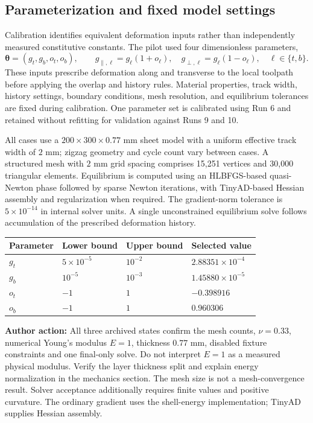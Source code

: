 \documentclass[11pt]{article}
\newcommand{\pending}[1]{\par\noindent\textbf{Author action:} #1\par}
\begin{document}
\subsection{Parameterization and fixed model settings}
Calibration identifies equivalent deformation inputs rather than independently measured constitutive constants. The pilot used four dimensionless parameters,
\begin{equation}
\boldsymbol\theta=(g_t,g_b,o_t,o_b),\qquad
 g_{\parallel,\ell}=g_\ell(1+o_\ell),\quad
 g_{\perp,\ell}=g_\ell(1-o_\ell),\quad \ell\in\{t,b\}.
\end{equation}
These inputs prescribe deformation along and transverse to the local toolpath before applying the overlap and history rules. Material properties, track width, history settings, boundary conditions, mesh resolution, and equilibrium tolerances are fixed during calibration. One parameter set is calibrated using Run 6 and retained without refitting for validation against Runs 9 and 10.

All cases use a $200\times300\times0.77$ mm sheet model with a uniform effective track width of $2$ mm; zigzag geometry and cycle count vary between cases. A structured mesh with $2$ mm grid spacing comprises 15,251 vertices and 30,000 triangular elements. Equilibrium is computed using an HLBFGS-based quasi-Newton phase \cite{liu2010hlbfgs} followed by sparse Newton iterations, with TinyAD-based Hessian assembly \cite{schmidt2022tinyad} and regularization when required. The gradient-norm tolerance is $5\times10^{-14}$ in internal solver units. A single unconstrained equilibrium solve follows accumulation of the prescribed deformation history.

\begin{center}
\begin{tabular}{llll}\toprule
Parameter & Lower bound & Upper bound & Selected value \\\midrule
$g_t$ & $5\times10^{-5}$ & $10^{-2}$ & $2.88351\times10^{-4}$ \\
$g_b$ & $10^{-5}$ & $10^{-3}$ & $1.45880\times10^{-5}$ \\
$o_t$ & $-1$ & $1$ & $-0.398916$ \\
$o_b$ & $-1$ & $1$ & $0.960306$ \\\bottomrule
\end{tabular}
\end{center}
\pending{All three archived states confirm the mesh counts, $\nu=0.33$, numerical Young's modulus $E=1$, thickness $0.77$ mm, disabled fixture constraints and one final-only solve. Do not interpret $E=1$ as a measured physical modulus. Verify the layer thickness split and explain energy normalization in the mechanics section. The mesh size is not a mesh-convergence result. Solver acceptance additionally requires finite values and positive curvature. The ordinary gradient uses the shell-energy implementation; TinyAD supplies Hessian assembly.}
\end{document}
